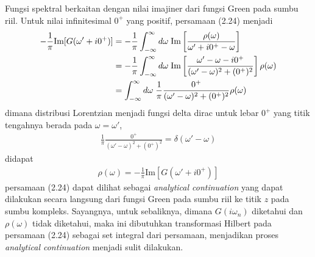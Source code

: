 Fungsi spektral berkaitan dengan nilai imajiner dari fungsi Green pada sumbu riil. Untuk nilai infinitesimal $0^+$ yang positif, persamaan (2.24) menjadi
\begin{align}
- \frac{1}{\pi} \text{Im} [ G(\omega' + i0^+) ] &= -\frac{1}{\pi} \int_{-\infty}^\infty d\omega \; \text{Im} \left[ \frac{\rho(\omega)}{\omega' + i0^+ - \omega}\right]\notag\\
&= - \frac{1}{\pi} \int_{-\infty}^\infty d\omega \; \text{Im} \left[ \frac{\omega' - \omega - i0^+}{(\omega' - \omega)^2 + (0^+)^2} \right] \rho(\omega) \notag\\
&= \int_{-\infty}^{\infty} d\omega \; \frac{1}{\pi} \frac{0^+}{(\omega' - \omega)^2 + (0^+)^2} \rho(\omega)
\end{align}
dimana distribusi Lorentzian menjadi fungsi delta dirac untuk lebar $0^+$ yang titik tengahnya berada pada $\omega = \omega'$, 
\begin{align}
\frac{1}{\pi} \frac{0^+}{(\omega' - \omega)^2 + (0^+)^2} = \delta(\omega' - \omega)
\end{align}
didapat
\begin{align}
\rho(\omega) = - \frac{1}{\pi} \text{Im} [ G(\omega' + i0^+) ]
\end{align}
persamaan (2.24) dapat dilihat sebagai \textit{analytical continuation} yang dapat dilakukan secara langsung dari fungsi Green pada sumbu riil ke titik $z$ pada sumbu kompleks. Sayangnya, untuk sebaliknya, dimana $G(i\omega_n)$ diketahui dan $\rho(\omega)$ tidak diketahui, maka ini dibutuhkan transformasi Hilbert pada persamaan (2.24) sebagai set integral dari persamaan, menjadikan proses \textit{analytical continuation} menjadi sulit dilakukan.

